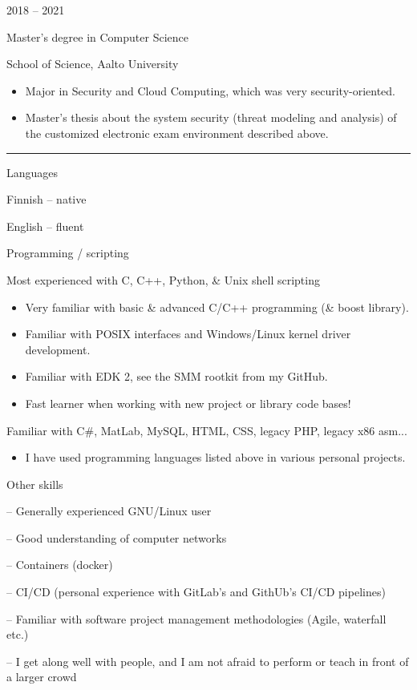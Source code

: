 \documentclass[a4paper,hidelinks,10pt]{article}
\newlength{\cvcolumngapwidth}
\newlength{\cvleftcolumnwidth}
\newlength{\cvrightcolumnwidth}
\newcommand{\cvsectionstyle}[1]{{\normalsize\cvsectionfont\textcolor{cvsectioncolor}{#1}}}
\newcommand{\cvtitlestyle}[1]{{\large\cvtitlefont\textcolor{cvtitlecolor}{#1}}}
\newcommand{\cvdurationstyle}[1]{{\small\cvdurationfont\textcolor{cvdurationcolor}{#1}}}
\newcommand{\cvheadingstyle}[1]{{\normalsize\cvheadingfont\textcolor{cvheadingcolor}{#1}}}
\newlength{\cvafteritemskipamount}
\newlength{\cvaftersectionskipamount}
\newlength{\cvbetweensectionandheadingextraskipamount}
\newlength{\cvaftertitleskipamount}
\newlength{\cvparskip}
\newcommand{\cvsection}[1]{
    \begin{minipage}[t]{\cvleftcolumnwidth}
        \raggedleft\cvsectionstyle{#1}
    \end{minipage}%
    \hspace{\cvcolumngapwidth}%
    \begin{minipage}[t]{\cvrightcolumnwidth}
        \textcolor{cvrulecolor}{\rule{\cvrightcolumnwidth}{0.3mm}}
    \end{minipage}

    \vspace{\cvaftersectionskipamount}
}
\newcommand{\cvitem}[2]{
    \begin{minipage}[t]{\cvleftcolumnwidth}
        \raggedleft #1
    \end{minipage}%
    \hspace{\cvcolumngapwidth}%
    \begin{minipage}[t]{\cvrightcolumnwidth}
        \setlength{\parskip}{\cvparskip} #2
    \end{minipage}

    \vspace{\cvafteritemskipamount}
}
\newcommand{\cvtitle}[1]{
    \cvtitlestyle{#1}

    \vspace{\cvaftertitleskipamount}
    \vspace{-\cvparskip}
}
\begin{document}
\cvitem{
    \cvdurationstyle{2018 -- 2021}
}{
    \cvtitle{Master's degree in Computer Science}

    School of Science, Aalto University

    \begin{itemize}[leftmargin=*]
        \item Major in Security and Cloud Computing, which was very security-oriented.
        \item Master's thesis about the system security (threat modeling and analysis) of the customized electronic exam environment described above.
    \end{itemize}
}


\newpage

\vspace*{2em}


\cvsection{SKILLS}

\vspace{\cvbetweensectionandheadingextraskipamount}

\cvitem{
    \cvheadingstyle{Languages}
}{
    Finnish -- native

    English -- fluent
}

\cvitem{
    \cvheadingstyle{Programming / scripting}
}{
    Most experienced with C, C++, Python, \& Unix shell scripting
    \begin{itemize}
        \item Very familiar with basic \& advanced C/C++ programming (\& boost library).
        \item Familiar with POSIX interfaces and Windows/Linux kernel driver development.
        \item Familiar with EDK 2, see the SMM rootkit from my GitHub.
        \item Fast learner when working with new project or library code bases!
    \end{itemize}
    
	\vspace{0.2cm}
    Familiar with C\#, MatLab, MySQL, HTML, CSS, legacy PHP, legacy x86 asm...
    \begin{itemize}
        \item I have used programming languages listed above in various personal projects.
    \end{itemize}
    
}

\cvitem{
    \cvheadingstyle{Other skills}
}{
    
    -- Generally experienced GNU/Linux user

    -- Good understanding of computer networks
    
    -- Containers (docker)
    
    -- CI/CD (personal experience with GitLab's and GithUb's CI/CD pipelines)
    
    -- Familiar with software project management methodologies (Agile, waterfall etc.)
    
    -- I get along well with people, and I am not afraid to perform or teach in front of a larger crowd

}
\end{document}
